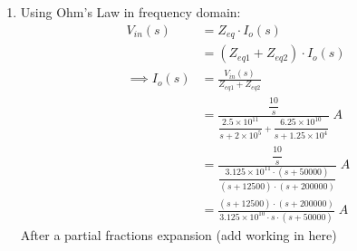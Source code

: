 \begin{enumerate}
{\begin{align*}
{		{s+1.25 \times 10^4}}{\dfrac{(6.25 \times 10^{10})					%
		(s + 2\times 10^5) + (2.5 \times 10^{11})(s + 1.25 \times 10^4)}	%
		{(s + 1.25 \times 10^4)\cdot(s + 2 \times 10^5)}} \; V\\
		&= \frac{10}{s} \cdot \frac{6.25 \times 10^{10}}            
		{s+1.25 \times 10^4} \cdot \frac{(s + 1.25 \times 10^4)
		\cdot(s + 2 \times 10^5)}{(6.25 \times 10^{10})
		(s + 2\times 10^5) + (2.5 \times 10^{11})
		(s + 1.25 \times 10^4)} \; V\\
		&= \frac{6.25 \times 10^{11} \cdot (s + 1.25 \times 10^4) \cdot 
		(s + 2 \times 10^5)}{3.125 \times 10^{11} \cdot s \cdot 
		(s + 1.25 \times 10^4) \cdot (s + 5 \times 10^4)} \; V\\
		&= \frac{2 \cdot (s + 2 \times 10^5)}
		{s \cdot (s + 5 \times 10^4)} \; V\\
		&= \frac{2s + 4 \times 10^5}{s^2 + 5 \times 10^4 \cdot s} \; V\\
		\end{align*}
		Using Partial fractions to continue.
		\begin{align*}
		\frac{2s + 4 \times 10^5}{s^2 + 5 \times 10^4 \cdot s} &= 
		\frac{A}{s} + \frac{B}{50000}\\
		A(s+50000) + Bs &= 2(s + 200000)\\
		(s = 0): \; 50000A &= 400000\\
		\implies A &= 8\\
		(s = -50000): \;  -50000B &= 300000\\
		B &= -6\\
		\implies V_o(s) = \frac{8}{s} - \frac{6}{s + 50000} \; V
		\end{align*}
		Using inverse Laplace transform to find $v_o(t)$.
		\begin{align*}
		v_o(t) &= \mathcal{L}^{-1} [V_o(s)]\\
		&= \mathcal{L}^{-1} \left[\frac{8}{s} - \frac{6}{s + 50000}\right]\; V\\
		&= (8 -6 e^{-50000t})u(t)\;V
		\end{align*}
	}
	\item{
		Using Ohm's Law in frequency domain:
		\begin{align*}
		V_{in}(s) &= Z_{eq} \cdot I_o(s)\\
		&= (Z_{eq1} + Z_{eq2}) \cdot I_o(s)\\
		\implies I_o(s) &= \frac{V_{in}(s)}{Z_{eq1} + Z_{eq2}}\\
		&= \frac{\dfrac{10}{s}} 
		{\dfrac{2.5 \times 10^{11}}
		{s + 2 \times 10^5} + \dfrac{6.25 \times 10^{10}}{s + 1.25 \times 10^4}} \; A\\
		&= \frac{\dfrac{10}{s}} 
		{\dfrac{3.125 \times 10^{11} \cdot (s + 50000)}{(s+12500)\cdot(s+200000)}} \; A\\
		&= \frac{(s+12500)\cdot(s+200000)}{3.125 \times 10^{10} \cdot s \cdot (s + 50000)} \; A
		\end{align*}
		After a partial fractions expansion (add working in here)
		
}
\end{enumerate}
